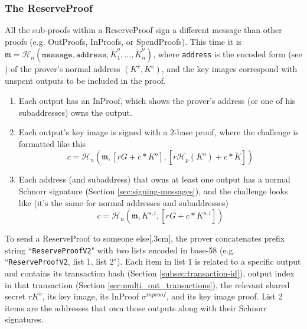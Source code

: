 \subsubsection*{The ReserveProof}%

All the sub-proofs within a ReserveProof sign a different message than other proofs (e.g. OutProofs, InProofs, or SpendProofs). This time it is $\mathfrak{m} = \mathcal{H}_n(\texttt{message}, \texttt{address}, \tilde{K}^o_1, ..., \tilde{K}^o_n)$, where {\tt address} is the encoded form (see \cite{luigi-address}) of the prover's normal address $(K^v, K^s)$, and the key images correspond with unspent outputs to be included in the proof.

\begin{enumerate}
    \item Each output has an InProof, which shows the prover's address (or one of his subaddresses) owns the output.
    \item Each output's key image is signed with a 2-base proof, where the challenge is formatted like this%
    \[c = \mathcal{H}_n(\mathfrak{m}, [r G + c*K^o], [r \mathcal{H}_p(K^o) + c*\tilde{K}])\]
    \item Each address (and subaddress) that owns at least one output has a normal Schnorr signature (Section \ref{sec:signing-messages}), and the challenge looks like (it's the same for normal addresses and subaddresses)
    \[c = \mathcal{H}_n(\mathfrak{m}, K^{s,i}, [r G + c*K^{s,i}])\]
\end{enumerate}{}

To send a ReserveProof to someone else[.3cm], the prover concatenates prefix string ``{\tt ReserveProofV2}" with two lists encoded in base-58 (e.g. ``{\tt ReserveProofV2}, list 1, list 2"). Each item in list 1 is related to a specific output and contains its transaction hash (Section \ref{subsec:transaction-id}), output index in that transaction (Section \ref{sec:multi_out_transactions}), the relevant shared secret $r K^v$, its key image, its InProof $\sigma^{inproof}$, and its key image proof. List 2 items are the addresses that own those outputs along with their Schnorr signatures.


